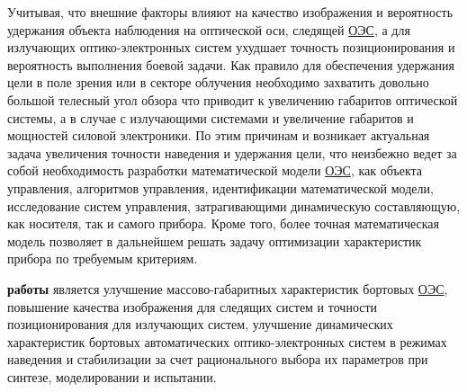 Учитывая, что внешние факторы влияют на качество изображения и вероятность удержания объекта наблюдения на оптической оси, следящей  \hyperref[acroEOS]{ОЭС}, а для излучающих оптико-электронных систем ухудшает точность позиционирования и вероятность выполнения боевой задачи.  Как правило для обеспечения удержания цели в поле зрения или в секторе облучения необходимо захватить довольно большой телесный угол обзора что приводит к увеличению габаритов оптической системы, а в случае с излучающими системами и увеличение габаритов и мощностей силовой электроники. По этим причинам и возникает актуальная задача увеличения точности наведения и удержания цели, что неизбежно ведет за собой необходимость разработки математической модели \hyperref[acroEOS]{ОЭС}, как объекта управления, алгоритмов управления, идентификации математической модели, исследование систем управления, затрагивающими динамическую составляющую, как носителя, так и самого прибора. Кроме того, более точная математическая модель позволяет в дальнейшем решать задачу оптимизации характеристик прибора по требуемым критериям.

\begin{comment}
\ifsynopsis
Этот абзац появляется только в~автореферате.
\else

\fi
\end{comment}


{\aim} \textbf{работы} является улучшение массово-габаритных характеристик бортовых  \hyperref[acroEOS]{ОЭС}, повышение качества изображения для следящих систем и точности позиционирования для излучающих систем, улучшение динамических характеристик бортовых автоматических оптико-электронных систем в режимах наведения и стабилизации за счет рационального выбора их параметров при синтезе, моделировании и испытании.

